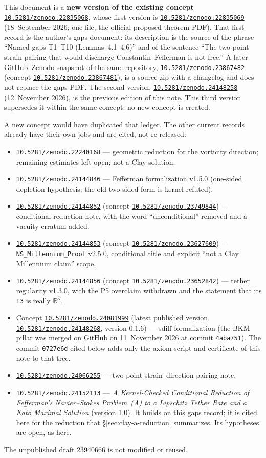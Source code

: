 \documentclass[11pt]{article}
\theoremstyle{plain}
\theoremstyle{definition}
\theoremstyle{remark}
\newcommand{\R}{\mathbb{R}}
\newcommand{\doi}[1]{\href{https://doi.org/#1}{\texttt{#1}}}
\newcommand{\sdiffsha}{0727e6d}
\begin{document}
This document is a \textbf{new version of the existing concept} \doi{10.5281/zenodo.22835068}, whose first version is \doi{10.5281/zenodo.22835069} (18~September 2026; one file, the official proposed theorem PDF). That first record is the author's gaps document: its description is the source of the phrase ``Named gaps T1--T10 (Lemmas~4.1--4.6)'' and of the sentence ``The two-point strain pairing that would discharge Constantin--Fefferman is not free.'' A later GitHub--Zenodo snapshot of the same repository, \doi{10.5281/zenodo.23867482} (concept \doi{10.5281/zenodo.23867481}), is a source zip with a changelog and does not replace the gaps PDF. The second version, \doi{10.5281/zenodo.24148258} (12~November 2026), is the previous edition of this note. This third version supersedes it within the same concept; no new concept is created.

A new concept would have duplicated that ledger. The other current records already have their own jobs and are cited, not re-released:
\begin{itemize}[leftmargin=1.4em]
\item \doi{10.5281/zenodo.22240168} --- geometric reduction for the vorticity direction; remaining estimates left open; not a Clay solution.
\item \doi{10.5281/zenodo.24144846} --- Fefferman formalization v1.5.0 (one-sided depletion hypothesis; the old two-sided form is kernel-refuted).
\item \doi{10.5281/zenodo.24144852} (concept \doi{10.5281/zenodo.23749844}) --- conditional reduction note, with the word ``unconditional'' removed and a vacuity erratum added.
\item \doi{10.5281/zenodo.24144853} (concept \doi{10.5281/zenodo.23627609}) --- \texttt{NS\_\hspace{0pt}Millennium\_\hspace{0pt}Proof} v2.5.0, conditional title and explicit ``not a Clay Millennium claim'' scope.
\item \doi{10.5281/zenodo.24144856} (concept \doi{10.5281/zenodo.23652842}) --- tether regularity v1.3.0, with the P5 overclaim withdrawn and the statement that its \texttt{T3} is really \(\R^{3}\).
\item Concept \doi{10.5281/zenodo.24081999} (latest published version \doi{10.5281/zenodo.24148268}, version 0.1.6) --- sdiff formalization (the BKM pillar was merged on GitHub on 11~November 2026 at commit \texttt{4aba751}). The commit \texttt{\sdiffsha} cited below adds only the axiom script and certificate of this note to that tree.
\item \doi{10.5281/zenodo.24066255} --- two-point strain--direction pairing note.
\item \doi{10.5281/zenodo.24152113} --- \emph{A Kernel-Checked Conditional Reduction of Fefferman's Navier--Stokes Problem~(A) to a Lipschitz Tether Rate and a Kato Maximal Solution} (version 1.0). It builds on this gaps record; it is cited here for the reduction that \S\ref{sec:clay-a-reduction} summarizes. Its hypotheses are open, as here.
\end{itemize}
The unpublished draft 23940666 is not modified or reused.
\end{document}
